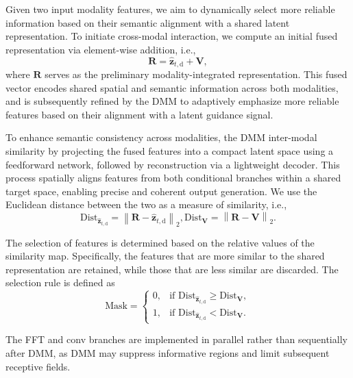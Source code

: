 \documentclass[a4paper,12pt]{article}
\begin{document}
Given two input modality features, we aim to dynamically select more reliable information based on their semantic alignment with a shared latent representation. To initiate cross-modal interaction, we compute an initial fused representation via element-wise addition, i.e.,
\begin{equation}
    \mathbf{R} = \hat{\mathbf{z}}_{t,\text{d}} + \mathbf{V},
\end{equation}
where \(\mathbf{R}\) serves as the preliminary modality-integrated representation. This fused vector encodes shared spatial and semantic information across both modalities, and is subsequently refined by the DMM to adaptively emphasize more reliable features based on their alignment with a latent guidance signal.

To enhance semantic consistency across modalities, the DMM inter-modal similarity by projecting the fused features into a compact latent space using a feedforward network, followed by reconstruction via a lightweight decoder. This process spatially aligns features from both conditional branches within a shared target space, enabling precise and coherent output generation. We use the Euclidean distance between the two as a measure of similarity, i.e.,
\begin{equation}
\text{Dist}_{\hat{\mathbf{z}}_{t,\text{d}}} = \left\| \mathbf{R} - \hat{\mathbf{z}}_{t,\text{d}} \right\|_2,
\text{Dist}_{\mathbf{V}} = \left\| \mathbf{R} - \mathbf{V} \right\|_2.
\end{equation}

The selection of features is determined based on the relative values of the similarity map. Specifically, the features that are more similar to the shared representation are retained, while those that are less similar are discarded. The selection rule is defined as
\begin{equation}
    \text{Mask} =
\begin{cases}
0, & \text{if } \text{Dist}_{\hat{\mathbf{z}}_{t,\text{d}}} \geq \text{Dist}_{\mathbf{V}}, \\
1, & \text{if } \text{Dist}_{\hat{\mathbf{z}}_{t,\text{d}}} < \text{Dist}_{\mathbf{V}}.
\end{cases}
\end{equation}

The FFT and conv branches are implemented in parallel rather than sequentially after DMM, as DMM may suppress informative regions and limit subsequent receptive fields.
\end{document}
